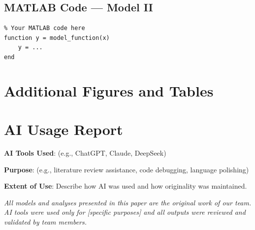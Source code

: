 \documentclass[12pt]{article}
\begin{document}
\subsection{MATLAB Code — Model II}
\begin{verbatim}
% Your MATLAB code here
function y = model_function(x)
    y = ...
end
\end{verbatim}

\section{Additional Figures and Tables}


\section{AI Usage Report}
\textbf{AI Tools Used}: (e.g., ChatGPT, Claude, DeepSeek)

\textbf{Purpose}: (e.g., literature review assistance, code debugging, language polishing)

\textbf{Extent of Use}: Describe how AI was used and how originality was maintained.

\vspace{12pt}
\textit{All models and analyses presented in this paper are the original work of our team. AI tools were used only for [specific purposes] and all outputs were reviewed and validated by team members.}
\end{document}
